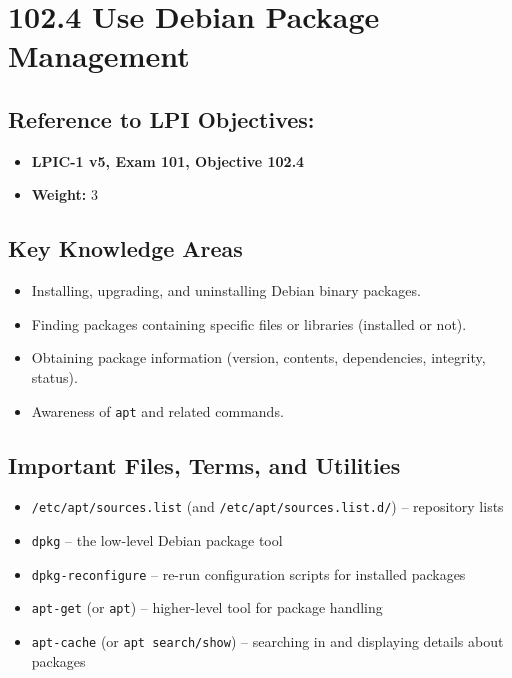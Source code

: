 \documentclass[a4paper]{report}
\begin{document}
\newpage

\section*{102.4 Use Debian Package Management}

\subsection*{Reference to LPI Objectives:}
\begin{itemize}
    \item \textbf{LPIC-1 v5, Exam 101, Objective 102.4}
    \item \textbf{Weight:} 3
\end{itemize}

\subsection*{Key Knowledge Areas}
\begin{itemize}
    \item Installing, upgrading, and uninstalling Debian binary packages.
    \item Finding packages containing specific files or libraries (installed or not).
    \item Obtaining package information (version, contents, dependencies, integrity, status).
    \item Awareness of \texttt{apt} and related commands.
\end{itemize}

\subsection*{Important Files, Terms, and Utilities}
\begin{itemize}
    \item \texttt{/etc/apt/sources.list} (and \texttt{/etc/apt/sources.list.d/}) – repository lists
    \item \texttt{dpkg} – the low-level Debian package tool
    \item \texttt{dpkg-reconfigure} – re-run configuration scripts for installed packages
    \item \texttt{apt-get} (or \texttt{apt}) – higher-level tool for package handling
    \item \texttt{apt-cache} (or \texttt{apt search/show}) – searching in and displaying details about packages
\end{itemize}
\end{document}
